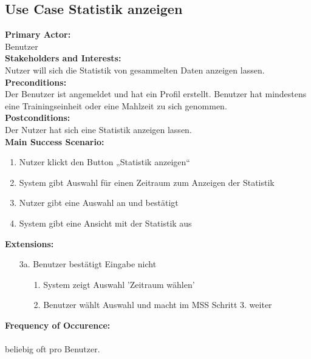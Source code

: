 \documentclass[12pt,a4paper,onecolumn]{article}
\begin{document}
\subsection{Use Case Statistik anzeigen}
\textbf{Primary Actor:}\\ Benutzer\\
\textbf{Stakeholders and Interests:}\\
Nutzer will sich die Statistik von gesammelten Daten anzeigen lassen. \\
\textbf{Preconditions:} \\ Der Benutzer ist angemeldet und hat ein Profil erstellt. Benutzer hat mindestens eine Trainingseinheit oder eine Mahlzeit zu sich genommen. \\
\textbf{Postconditions:}\\Der Nutzer hat sich eine Statistik anzeigen lassen.\\
\textbf{Main Success Scenario:}
\begin{enumerate}
    \item Nutzer klickt den Button „Statistik anzeigen“
    \item System gibt Auswahl für einen Zeitraum zum Anzeigen der Statistik
    \item Nutzer gibt eine Auswahl an und bestätigt
    \item System gibt eine Ansicht mit der Statistik aus
\end{enumerate}
\textbf{Extensions:}
\begin{enumerate}
    \item [3a.]  Benutzer bestätigt Eingabe nicht
    \begin{enumerate}
        \item[1.]System zeigt Auswahl 'Zeitraum wählen'
        \item[2.]Benutzer wählt Auswahl und macht im MSS Schritt 3. weiter
    \end{enumerate}
\end{enumerate}
\textbf{Frequency of Occurence:}\\ \\
beliebig oft pro Benutzer.
\end{document}
